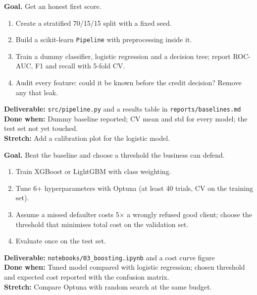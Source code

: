 \begin{tcolorbox}[enhanced,breakable,colback=white,colframe=sun,boxrule=0.8pt,arc=2pt,left=7pt,right=7pt,top=4pt,bottom=4pt,
  title={\bfseries Tuesday --- Baselines, pipelines and leakage audit\hfill\normalfont\small 2--3 h},coltitle=white,colbacktitle=sun,fonttitle=\small]
\textbf{Goal.} Get an honest first score.
\begin{enumerate}[itemsep=1pt,topsep=2pt]
  \item Create a stratified 70/15/15 split with a fixed seed.
  \item Build a scikit-learn \texttt{Pipeline} with preprocessing inside it.
  \item Train a dummy classifier, logistic regression and a decision tree; report ROC-AUC, F1 and recall with 5-fold CV.
  \item Audit every feature: could it be known before the credit decision? Remove any that leak.
\end{enumerate}
\textbf{\color{dataC}Deliverable:} \texttt{src/pipeline.py} and a results table in \texttt{reports/baselines.md}\\
\textbf{\color{navy}Done when:} Dummy baseline reported; CV mean and std for every model; the test set not yet touched.\\
\textbf{\color{skillC}Stretch:} Add a calibration plot for the logistic model.
\end{tcolorbox}

\begin{tcolorbox}[enhanced,breakable,colback=white,colframe=sun,boxrule=0.8pt,arc=2pt,left=7pt,right=7pt,top=4pt,bottom=4pt,
  title={\bfseries Wednesday --- Gradient boosting, tuning and a cost-aware threshold\hfill\normalfont\small 3 h},coltitle=white,colbacktitle=sun,fonttitle=\small]
\textbf{Goal.} Beat the baseline and choose a threshold the business can defend.
\begin{enumerate}[itemsep=1pt,topsep=2pt]
  \item Train XGBoost or LightGBM with class weighting.
  \item Tune 6+ hyperparameters with Optuna (at least 40 trials, CV on the training set).
  \item Assume a missed defaulter costs 5$\times$ a wrongly refused good client; choose the threshold that minimises total cost on the validation set.
  \item Evaluate once on the test set.
\end{enumerate}
\textbf{\color{dataC}Deliverable:} \texttt{notebooks/03\_boosting.ipynb} and a cost curve figure\\
\textbf{\color{navy}Done when:} Tuned model compared with logistic regression; chosen threshold and expected cost reported with the confusion matrix.\\
\textbf{\color{skillC}Stretch:} Compare Optuna with random search at the same budget.
\end{tcolorbox}

